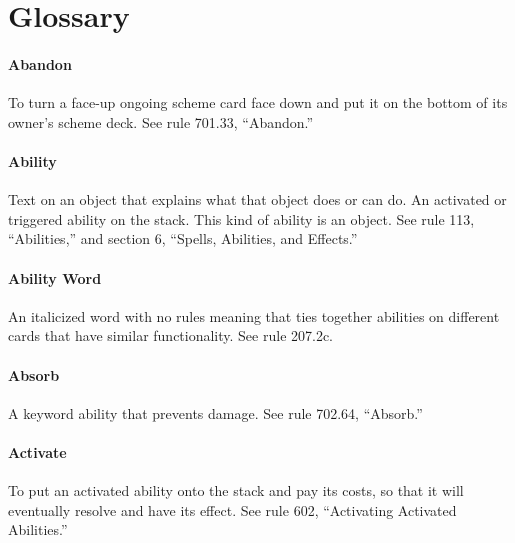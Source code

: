 \chapter*{Glossary}
{}



\subsubsection*{Abandon}

To turn a face-up ongoing scheme card face down and put it on the bottom of its owner’s scheme deck. See rule 701.33, “Abandon.”

\subsubsection*{Ability}

Text on an object that explains what that object does or can do.
An activated or triggered ability on the stack. This kind of ability is an object.
See rule 113, “Abilities,” and section 6, “Spells, Abilities, and Effects.”

\subsubsection*{Ability Word}

An italicized word with no rules meaning that ties together abilities on different cards that have similar functionality. See rule 207.2c.

\subsubsection*{Absorb}

A keyword ability that prevents damage. See rule 702.64, “Absorb.”

\subsubsection*{Activate}

To put an activated ability onto the stack and pay its costs, so that it will eventually resolve and have its effect. See rule 602, “Activating Activated Abilities.”


